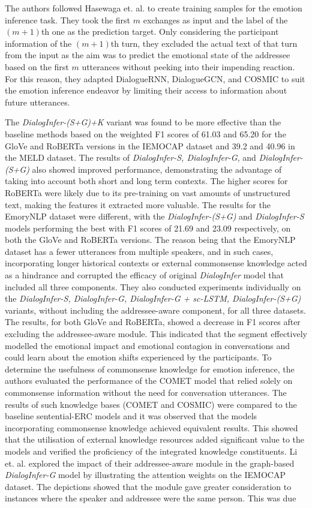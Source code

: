 The authors followed Hasewaga et. al. \cite{hasegawa-etal-2013-predicting} to create training samples for the emotion inference task. They took the first $m$ exchanges as input and the label of the $(m+1)$th one as the prediction target. Only considering the participant information of the $(m+1)$th turn, they excluded the actual text of that turn from the input as the aim was to predict the emotional state of the addressee based on the first $m$ utterances without peeking into their impending reaction. For this reason, they adapted DialogueRNN, DialogueGCN, and COSMIC to suit the emotion inference endeavor by limiting their access to information about future utterances.

The \textit{DialogInfer-(S+G)+K} variant was found to be more effective than the baseline methods based on the weighted F1 scores of 61.03 and 65.20 for the GloVe and RoBERTa versions in the IEMOCAP dataset and 39.2 and 40.96 in the MELD dataset. The results of \textit{DialogInfer-S, DialogInfer-G}, and \textit{DialogInfer-(S+G)} also showed improved performance, demonstrating the advantage of taking into account both short and long term contexts. The higher scores for RoBERTa were likely due to its pre-training on vast amounts of unstructured text, making the features it extracted more valuable. The results for the EmoryNLP dataset were different, with the \textit{DialogInfer-(S+G)} and \textit{DialogInfer-S} models performing the best with F1 scores of 21.69 and 23.09 respectively, on both the GloVe and RoBERTa versions. The reason being that the EmoryNLP dataset has a fewer utterances from multiple speakers, and in such cases, incorporating longer historical contexts or external commonsense knowledge acted as a hindrance and corrupted the efficacy of original \textit{DialogInfer} model that included all three components. They also conducted experiments individually on the \textit{DialogInfer-S, DialogInfer-G, DialogInfer-G + sc-LSTM, DialogInfer-(S+G)} variants, without including the addressee-aware component, for all three datasets. The results, for both GloVe and RoBERTa, showed a decrease in F1 scores after excluding the addressee-aware module. This indicated that the segment effectively modelled the emotional impact and emotional contagion in conversations and could learn about the  emotion shifts experienced by the participants. To determine the usefulness of commonsense knowledge for emotion inference, the authors evaluated the performance of the COMET model that relied solely on commonsense information without the need for conversation utterances. The results of such knowledge bases (COMET and COSMIC) were compared to the baseline sentential-ERC models and it was observed that the models incorporating commonsense knowledge achieved equivalent results. This showed that the utilisation of external knowledge resources added significant value to the models and verified the proficiency of the integrated knowledge constituents. Li et. al. explored the impact of their addressee-aware module in the graph-based \textit{DialogInfer-G} model by illustrating the attention weights on the IEMOCAP dataset. The depictions showed that the module gave greater consideration to instances where the speaker and addressee were the same person. This was due 